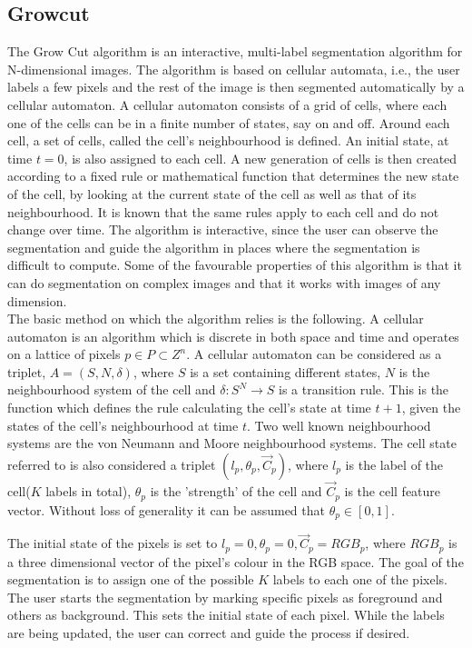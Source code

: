 \documentclass[a4paper,10pt]{article}
\begin{document}
\subsection{Growcut}
The Grow Cut algorithm is an interactive, multi-label segmentation algorithm for N-dimensional images.  The algorithm is based on cellular automata, i.e.,  the user labels a few pixels
and the rest of the image is then segmented automatically by a cellular automaton.  A cellular automaton consists of a grid of cells, where each one of the cells can be in 
a finite number of states, say on and off.   Around each cell, a set of cells, called the cell's neighbourhood is defined.  An initial state, at time $t = 0$, is also assigned to each cell.
A new generation of cells is then created according to a fixed rule or mathematical function that determines the new state of the cell, by looking at the current state of the cell as well
as that of its neighbourhood.  It is known that the same rules apply to each cell and do not change over time.
The algorithm is interactive, since the user can observe the segmentation and guide the algorithm in places where the segmentation is difficult to compute.
Some of the favourable properties of this algorithm is that it can do segmentation on complex images and that it works with images of any dimension. \\


\noindent The basic method on which the algorithm relies is the following.  A cellular automaton is an algorithm which is discrete in both space and time and operates on a 
lattice of pixels $p \in P \subset Z^{n}$.  A cellular automaton can be considered as a triplet, $A = (S, N, \delta)$, where $S$ is a set containing different states, $N$ is the
neighbourhood system of the cell and $\delta: S^{N} \rightarrow S $ is a transition rule.  This is the function which defines  the rule calculating the cell's state at time $t + 1$, given the states 
of the cell's neighbourhood at time $t$.  Two well known neighbourhood systems are the von Neumann and Moore neighbourhood systems.  The cell state referred to is also
considered a triplet $(l_{p}, \theta_{p}, \overrightarrow{C}_{p})$, where $l_{p}$ is the label of the cell($K$ labels in total), $\theta_{p}$ is the 'strength' of the cell and $\overrightarrow{C}_{p}$ is
the cell feature vector.  Without loss of generality it can be assumed that $\theta_{p} \in [0,1]$. 

The initial state of the pixels is set to $l_{p} = 0, \theta_{p} = 0, \overrightarrow{C}_{p} = RGB_{p}$, where $RGB_{p}$ is a three dimensional vector of the pixel's colour in 
the RGB space.  The goal of the segmentation is to assign one of the possible $K$ labels to each one of the pixels.  The user starts the segmentation by marking specific pixels as
foreground and others as background.  This sets the initial state of each pixel.  While the labels are being updated, the user can correct and guide the process if desired.  \\
\end{document}
